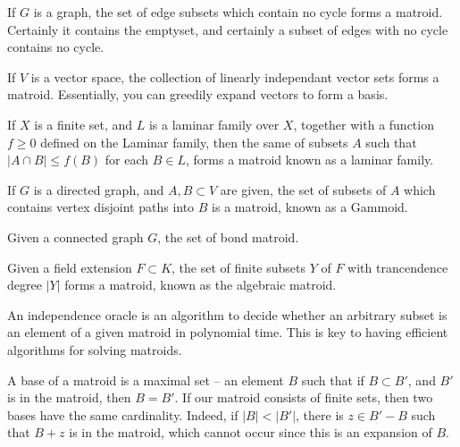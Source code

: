 \begin{example}
    If $G$ is a graph, the set of edge subsets which contain no cycle forms a matroid. Certainly it contains the emptyset, and certainly a subset of edges with no cycle contains no cycle.
\end{example}

\begin{example}
    If $V$ is a vector space, the collection of linearly independant vector sets forms a matroid. Essentially, you can greedily expand vectors to form a basis.
\end{example}

\begin{example}
    If $X$ is a finite set, and $L$ is a laminar family over $X$, together with a function $f \geq 0$ defined on the Laminar family, then the same of subsets $A$ such that $|A \cap B| \leq f(B)$ for each $B \in L$, forms a matroid known as a laminar family.
\end{example}

\begin{example}
    If $G$ is a directed graph, and $A, B \subset V$ are given, the set of subsets of $A$ which contains vertex disjoint paths into $B$ is a matroid, known as a Gammoid.
\end{example}

\begin{example}
    Given a connected graph $G$, the set of bond matroid.
\end{example}

\begin{example}
    Given a field extension $F \subset K$, the set of finite subsets $Y$ of $F$ with trancendence degree $|Y|$ forms a matroid, known as the algebraic matroid.
\end{example}

An independence oracle is an algorithm to decide whether an arbitrary subset is an element of a given matroid in polynomial time. This is key to having efficient algorithms for solving matroids.

A base of a matroid is a maximal set -- an element $B$ such that if $B \subset B'$, and $B'$ is in the matroid, then $B = B'$. If our matroid consists of finite sets, then two bases have the same cardinality. Indeed, if $|B| < |B'|$, there is $z \in B' - B$ such that $B + z$ is in the matroid, which cannot occur since this is an expansion of $B$.

